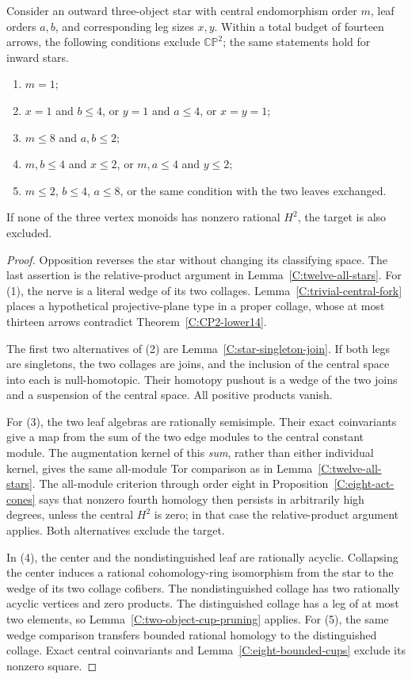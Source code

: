 \begin{lemma}\label{C:generic-star-deletions}
Consider an outward three-object star with central endomorphism
order $m$, leaf orders $a,b$, and corresponding leg sizes $x,y$.
Within a total budget of fourteen arrows, the following conditions
exclude $\mathbb{CP}^2$; the same statements hold for inward stars.
\begin{enumerate}
\item $m=1$;
\item $x=1$ and $b\leq4$, or $y=1$ and $a\leq4$, or $x=y=1$;
\item $m\leq8$ and $a,b\leq2$;
\item $m,b\leq4$ and $x\leq2$, or $m,a\leq4$ and $y\leq2$;
\item $m\leq2$, $b\leq4$, $a\leq8$, or the same condition
with the two leaves exchanged.
\end{enumerate}
If none of the three vertex monoids has nonzero rational $H^2$,
the target is also excluded.
\end{lemma}
\begin{proof}
Opposition reverses the star without changing its classifying
space. The last assertion is the relative-product argument in
Lemma~\ref{C:twelve-all-stars}. For (1), the nerve is a literal
wedge of its two collages. Lemma~\ref{C:trivial-central-fork}
places a hypothetical projective-plane type in a proper collage,
whose at most thirteen arrows contradict
Theorem~\ref{C:CP2-lower14}.

The first two alternatives of (2) are
Lemma~\ref{C:star-singleton-join}. If both legs are singletons,
the two collages are joins, and the inclusion of the central
space into each is null-homotopic. Their homotopy pushout is a
wedge of the two joins and a suspension of the central space.
All positive products vanish.

For (3), the two leaf algebras are rationally semisimple. Their
exact coinvariants give a map from the sum of the two edge
modules to the central constant module. The augmentation kernel
of this \emph{sum}, rather than either individual kernel, gives
the same all-module Tor comparison as in
Lemma~\ref{C:twelve-all-stars}. The all-module criterion through
order eight in Proposition~\ref{C:eight-act-cones} says that
nonzero fourth homology then persists in arbitrarily high degrees,
unless the central $H^2$ is zero; in that case the relative-product
argument applies. Both alternatives exclude the target.

In (4), the center and the nondistinguished leaf are rationally
acyclic. Collapsing the center induces a rational cohomology-ring
isomorphism from the star to the wedge of its two collage cofibers.
The nondistinguished collage has two rationally acyclic vertices
and zero products. The distinguished collage has a leg of at most
two elements, so Lemma~\ref{C:two-object-cup-pruning} applies.
For (5), the same wedge comparison transfers bounded rational
homology to the distinguished collage. Exact central coinvariants
and Lemma~\ref{C:eight-bounded-cups} exclude its nonzero square.
\end{proof}

